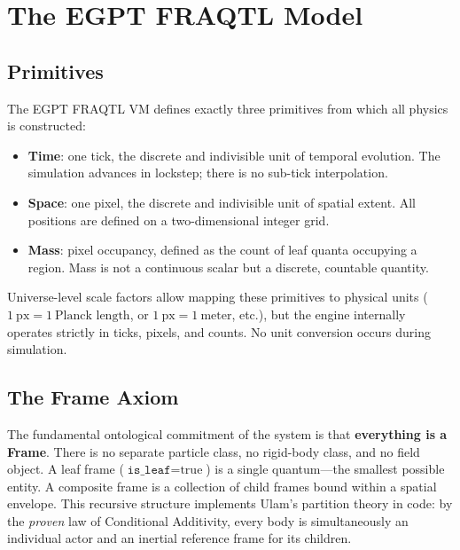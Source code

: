 \documentclass[11pt,a4paper]{article}
\begin{document}
\section{The EGPT FRAQTL Model}
\label{sec:model}

\subsection{Primitives}

The EGPT FRAQTL VM defines exactly three primitives from which all physics is constructed:

\begin{itemize}
    \item \textbf{Time}: one tick, the discrete and indivisible unit of temporal evolution. The simulation advances in lockstep; there is no sub-tick interpolation.
    \item \textbf{Space}: one pixel, the discrete and indivisible unit of spatial extent. All positions are defined on a two-dimensional integer grid.
    \item \textbf{Mass}: pixel occupancy, defined as the count of leaf quanta occupying a region. Mass is not a continuous scalar but a discrete, countable quantity.
\end{itemize}

Universe-level scale factors allow mapping these primitives to physical units ($1\ \text{px} = 1\ \text{Planck length}$, or $1\ \text{px} = 1\ \text{meter}$, etc.), but the engine internally operates strictly in ticks, pixels, and counts. No unit conversion occurs during simulation.

\subsection{The Frame Axiom}

The fundamental ontological commitment of the system is that \textbf{everything is a Frame}. There is no separate particle class, no rigid-body class, and no field object. A leaf frame ($\texttt{is\_leaf} = \text{true}$) is a single quantum---the smallest possible entity. A composite frame is a collection of child frames bound within a spatial envelope. This recursive structure implements Ulam's partition theory in code: by the \emph{proven} law of Conditional Additivity, every body is simultaneously an individual actor and an inertial reference frame for its children.
\end{document}
